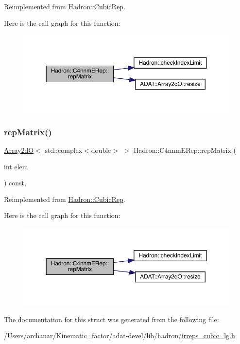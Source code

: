 Reimplemented from \mbox{\hyperlink{structHadron_1_1CubicRep_ac5d7e9e6f4ab1158b5fce3e4ad9e8005}{Hadron\+::\+Cubic\+Rep}}.

Here is the call graph for this function\+:
\nopagebreak
\begin{figure}[H]
\begin{center}
\leavevmode
\includegraphics[width=350pt]{dc/d30/structHadron_1_1C4nnmERep_adb5804895fb825dd5a5fde9c417e5cb8_cgraph}
\end{center}
\end{figure}
\mbox{\label{structHadron_1_1C4nnmERep_adb5804895fb825dd5a5fde9c417e5cb8}} 
\subsubsection{\texorpdfstring{repMatrix()}{repMatrix()}\hspace{0.1cm}{\footnotesize\ttfamily [3/3]}}
{\footnotesize\ttfamily \mbox{\hyperlink{classADAT_1_1Array2dO}{Array2dO}}$<$ std\+::complex$<$double$>$ $>$ Hadron\+::\+C4nnm\+E\+Rep\+::rep\+Matrix (\begin{DoxyParamCaption}\item[{int}]{elem }\end{DoxyParamCaption}) const\hspace{0.3cm}{\ttfamily [inline]}, {\ttfamily [virtual]}}



Reimplemented from \mbox{\hyperlink{structHadron_1_1CubicRep_ac5d7e9e6f4ab1158b5fce3e4ad9e8005}{Hadron\+::\+Cubic\+Rep}}.

Here is the call graph for this function\+:
\nopagebreak
\begin{figure}[H]
\begin{center}
\leavevmode
\includegraphics[width=350pt]{dc/d30/structHadron_1_1C4nnmERep_adb5804895fb825dd5a5fde9c417e5cb8_cgraph}
\end{center}
\end{figure}


The documentation for this struct was generated from the following file\+:\begin{DoxyCompactItemize}
\item 
/\+Users/archanar/\+Kinematic\+\_\+factor/adat-\/devel/lib/hadron/\mbox{\hyperlink{adat-devel_2lib_2hadron_2irreps__cubic__lg_8h}{irreps\+\_\+cubic\+\_\+lg.\+h}}\end{DoxyCompactItemize}
